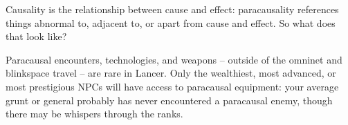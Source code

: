 Causality is the relationship between cause and effect: paracausality references things abnormal  
to, adjacent to, or apart from cause and effect. So what does that look like? 
 

Paracausal encounters, technologies, and weapons -- outside of the omninet and blinkspace  
travel -- are rare in Lancer. Only the wealthiest, most advanced, or most prestigious NPCs will  
have access to paracausal equipment: your average grunt or general probably has never  
encountered a paracausal enemy, though there may be whispers through the ranks. 
 

                                                                                                               


  
